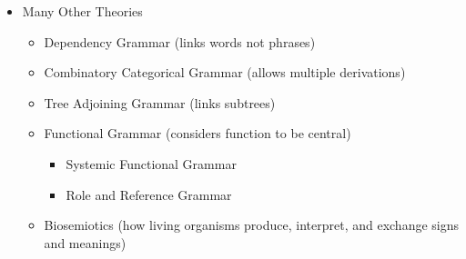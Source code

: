 \documentclass[a4paper,landscape,headrule,footrule]{foils}
\begin{document}
  \begin{tree}\tiny
    { {
        {}}}
     
  \end{tree}
\vspace*{-2em}
  \begin{small}
    \begin{itemize}
    \item Many Other Theories
      \begin{itemize}
      \item Dependency Grammar  (links words not phrases)
      \item Combinatory Categorical Grammar (allows multiple derivations)
      \item Tree Adjoining Grammar (links subtrees)
      \item Functional Grammar (considers function to be central)
        \begin{itemize}
        \item Systemic Functional Grammar
        \item Role and Reference Grammar
        \end{itemize}
      \item Biosemiotics (how living organisms produce, interpret, and exchange signs and meanings)
      \end{itemize}
    \end{itemize}
  \end{small}
\end{document}
